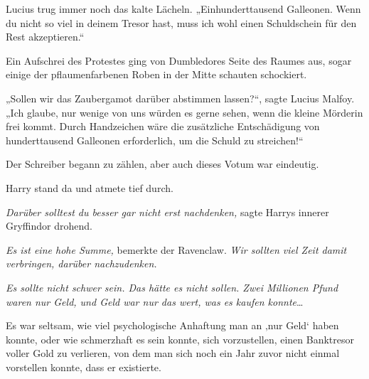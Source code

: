 Lucius trug immer noch das kalte Lächeln. „Einhunderttausend Galleonen. Wenn du nicht so viel in deinem Tresor hast, muss ich wohl einen Schuldschein für den Rest akzeptieren.“

Ein Aufschrei des Protestes ging von Dumbledores Seite des Raumes aus, sogar einige der pflaumenfarbenen Roben in der Mitte schauten schockiert.

„Sollen wir das Zaubergamot darüber abstimmen lassen?“, sagte Lucius Malfoy. „Ich glaube, nur wenige von uns würden es gerne sehen, wenn die kleine Mörderin frei kommt. Durch Handzeichen wäre die zusätzliche Entschädigung von hunderttausend Galleonen erforderlich, um die Schuld zu streichen!“

Der Schreiber begann zu zählen, aber auch dieses Votum war eindeutig.

Harry stand da und atmete tief durch.

\emph{Darüber solltest du besser gar nicht erst nachdenken,} sagte Harrys innerer Gryffindor drohend.

\emph{Es ist eine hohe Summe,} bemerkte der Ravenclaw. \emph{Wir sollten viel Zeit damit verbringen, darüber nachzudenken.}

\emph{Es sollte nicht schwer sein. Das hätte es nicht sollen. Zwei Millionen Pfund waren nur Geld, und Geld war nur das wert, was es kaufen konnte}…

Es war seltsam, wie viel psychologische Anhaftung man an ‚nur Geld‘ haben konnte, oder wie schmerzhaft es sein konnte, sich vorzustellen, einen Banktresor voller Gold zu verlieren, von dem man sich noch ein Jahr zuvor nicht einmal vorstellen konnte, dass er existierte.

